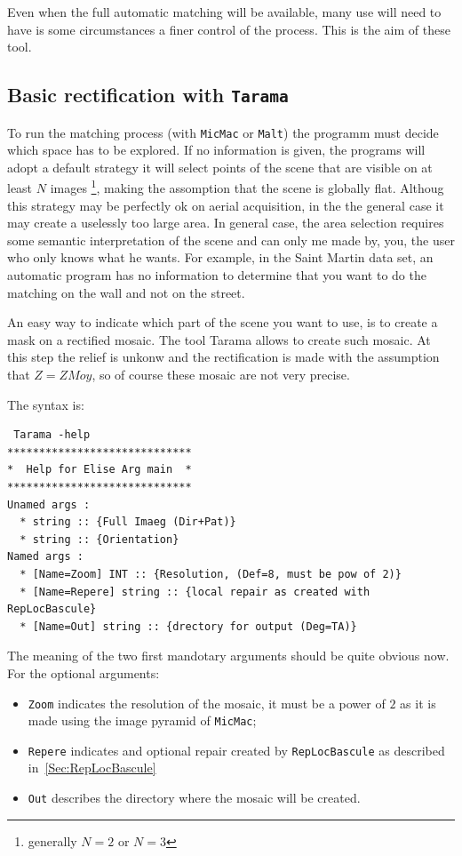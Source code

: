 \label{SemiAutoMatch}

Even when the full automatic matching will be available, many use will need to have
is some circumstances a finer control of the process. This is the aim of these tool.

\subsection{Basic rectification with {\tt Tarama}}

\label{Sec:Tarama}

To run the matching process (with {\tt MicMac} or {\tt Malt}) the
programm must decide which space has to be explored. If no
information is given, the programs will adopt a default strategy it
will select points of the scene that are visible on at least $N$ images
\footnote{generally $N=2$ or $N=3$}, 
making the assomption that the scene is globally flat. Althoug this
strategy may be perfectly ok on aerial acquisition, in the the general
case it may create a uselessly too large area. In general case, the
area selection requires some semantic interpretation of the scene
and can only me made by, you, the user who only knows what he wants.
For example, in the Saint Martin data set, an automatic program has no
information to determine that you want  to do the matching on the wall
and not on the street.

An easy way to indicate which part of the scene you want to use,
is to create a mask on a rectified mosaic.  The tool Tarama allows
to create such mosaic. At this step the relief is unkonw and the 
rectification is made with the assumption that $Z=ZMoy$, so of
course these mosaic are not very precise.

The syntax is:

\begin{verbatim}
 Tarama -help
*****************************
*  Help for Elise Arg main  *
*****************************
Unamed args : 
  * string :: {Full Imaeg (Dir+Pat)}
  * string :: {Orientation}
Named args : 
  * [Name=Zoom] INT :: {Resolution, (Def=8, must be pow of 2)}
  * [Name=Repere] string :: {local repair as created with RepLocBascule}
  * [Name=Out] string :: {drectory for output (Deg=TA)}
\end{verbatim}

The meaning of the two first mandotary arguments should be quite obvious now.
For the optional arguments:

\begin{itemize}
   \item  {\tt Zoom} indicates the resolution of the mosaic, it must be a power
          of $2$ as it is made using the image pyramid of {\tt MicMac};

   \item  {\tt Repere} indicates and optional repair created by {\tt RepLocBascule}
          as described in~\ref{Sec:RepLocBascule}
   \item {\tt Out} describes the directory where the mosaic will be created.
\end{itemize}

